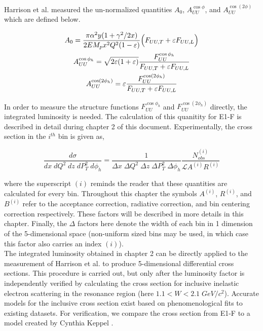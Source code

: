 Harrison et al. measured the un-normalized quantities $A_0$, $A_{UU}^{\cos\phi}$, and $A_{UU}^{\cos(2\phi)}$ which are defined below.  

\begin{gather}
	A_{0} = \frac{\pi \alpha^2 y (1+\gamma^2/2x)}{2 E M_p x^2 Q^2 (1-\varepsilon)} \Bigl( F_{UU,T} + \varepsilon F_{UU,L} \Bigr) \\
	A_{UU}^{\cos\phi_h} = \sqrt{2\varepsilon(1+\varepsilon)} \frac{F_{UU}^{\cos\phi_h}}{F_{UU,T} + \varepsilon F_{UU,L}} \\
	A_{UU}^{\cos(2\phi_h)} = \varepsilon \frac{F_{UU}^{\cos(2\phi_h)}}{F_{UU,T} + \varepsilon F_{UU,L}}
\end{gather}

In order to measure the structure functions $F_{UU}^{\cos\phi_h}$ and $F_{UU}^{\cos(2\phi_h)}$ directly, the integrated luminosity is needed.  The calculation of this quanitity for E1-F is described in detail during chapter 2 of this document.  Experimentally, the cross section in the $i^{th}$ bin is given as, 

\begin{equation}
	\frac{d\sigma}{dx \; dQ^2 \; dz \; dP_T^2 \; d\phi_h} = \frac{1}{\Delta x \; \Delta Q^2 \; \Delta z \; \Delta P_T^2 \; \Delta \phi_h} \frac{N_{obs}^{(i)}}{\mathcal{L} A^{(i)} R^{(i)}} 
\end{equation}

where the superscript $(i)$ reminds the reader that these quantities are calculated for every bin.  Throughout this chapter the symbols $A^{(i)}$, $R^{(i)}$, and $B^{(i)}$ refer to the acceptance correction, radiative correction, and bin centering correction respectively.  These factors will be described in more details in this chapter. Finally, the $\Delta$ factors here denote the width of each bin in 1 dimension of the 5-dimensional space (non-uniform sized bins may be used, in which case this factor also carries an index $(i)$).\\

The integrated luminosity obtained in chapter 2 can be directly applied to the measurement of Harrison et al. to produce 5-dimensional differential cross sections.  This procedure is carried out, but only after the luminosity factor is independently verified by calculating the cross section for inclusive inelastic electron scattering in the resonance region (here $1.1 < W < 2.1 \; GeV/c^2$).  Accurate models for the inclusive cross section exist based on phenomenological fits to existing datasets.  For verification, we compare the cross section from E1-F to a model created by Cynthia Keppel \cite{find-keppel-reference}. \\


